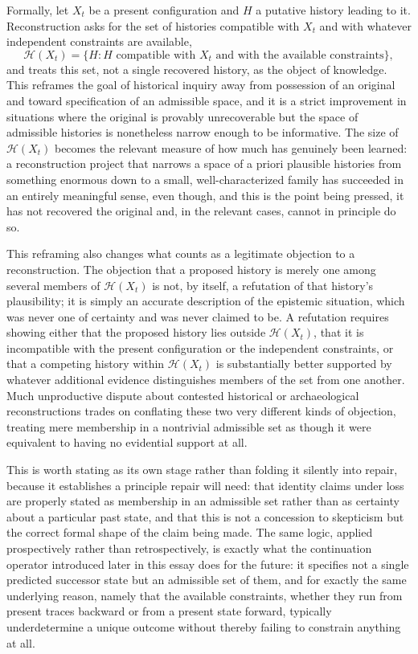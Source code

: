 \documentclass[11pt]{article}
\begin{document}
Formally, let $X_t$ be a present configuration and $H$ a putative history leading to it. Reconstruction asks for the set of histories compatible with $X_t$ and with whatever independent constraints are available,
$$\mathcal{H}(X_t) = \{H : H \text{ compatible with } X_t \text{ and with the available constraints}\},$$
and treats this set, not a single recovered history, as the object of knowledge. This reframes the goal of historical inquiry away from possession of an original and toward specification of an admissible space, and it is a strict improvement in situations where the original is provably unrecoverable but the space of admissible histories is nonetheless narrow enough to be informative. The size of $\mathcal{H}(X_t)$ becomes the relevant measure of how much has genuinely been learned: a reconstruction project that narrows a space of a priori plausible histories from something enormous down to a small, well-characterized family has succeeded in an entirely meaningful sense, even though, and this is the point being pressed, it has not recovered the original and, in the relevant cases, cannot in principle do so.

This reframing also changes what counts as a legitimate objection to a reconstruction. The objection that a proposed history is merely one among several members of $\mathcal{H}(X_t)$ is not, by itself, a refutation of that history's plausibility; it is simply an accurate description of the epistemic situation, which was never one of certainty and was never claimed to be. A refutation requires showing either that the proposed history lies outside $\mathcal{H}(X_t)$, that it is incompatible with the present configuration or the independent constraints, or that a competing history within $\mathcal{H}(X_t)$ is substantially better supported by whatever additional evidence distinguishes members of the set from one another. Much unproductive dispute about contested historical or archaeological reconstructions trades on conflating these two very different kinds of objection, treating mere membership in a nontrivial admissible set as though it were equivalent to having no evidential support at all.

This is worth stating as its own stage rather than folding it silently into repair, because it establishes a principle repair will need: that identity claims under loss are properly stated as membership in an admissible set rather than as certainty about a particular past state, and that this is not a concession to skepticism but the correct formal shape of the claim being made. The same logic, applied prospectively rather than retrospectively, is exactly what the continuation operator introduced later in this essay does for the future: it specifies not a single predicted successor state but an admissible set of them, and for exactly the same underlying reason, namely that the available constraints, whether they run from present traces backward or from a present state forward, typically underdetermine a unique outcome without thereby failing to constrain anything at all.
\end{document}
